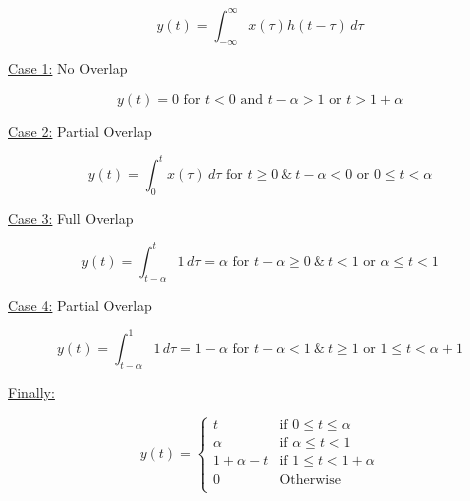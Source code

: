 \documentclass[20pt]{article}
\begin{document}
\begin{equation}
    y(t)= \int_{-\infty}^{\infty} x(\tau) h(t-\tau)  \,d\tau
\end{equation}

\underline{Case 1:} No Overlap

\begin{equation}
    y(t)=0 \text{ for } t < 0 \text{ and } t - \alpha >  1 \text{ or } t  > 1 + \alpha
\end{equation}


\underline{Case 2:} Partial Overlap

\begin{equation}
    y(t)= \int_{0}^{t} x(\tau) \,d\tau  \text{ for } t \geq 0\ \& \ t - \alpha < 0 \text{ or } 0 \leq t < \alpha
\end{equation}

\underline{Case 3:} Full Overlap

\begin{equation}
    y(t)= \int_{t-\alpha}^{t} 1 \,d\tau = \alpha  \text{ for } t - \alpha \geq 0\ \& \ t < 1 \text{ or } \alpha \leq t < 1
\end{equation}

\underline{Case 4:} Partial Overlap

\begin{equation}
    y(t)= \int_{t-\alpha}^{1} 1 \,d\tau = 1 - \alpha  \text{ for } t - \alpha < 1\ \& \ t \geq 1 \text{ or } 1 \leq t <  \alpha + 1
\end{equation}

\underline{Finally:}

\begin{equation}
    y(t)=
    \begin{cases}
        t          & \text{if } 0 \leq t \leq \alpha  \\
        \alpha     & \text{if } \alpha \leq t < 1     \\
        1+\alpha-t & \text{if } 1 \leq t < 1 + \alpha \\
        0          & \text{Otherwise}                 \\
    \end{cases}
\end{equation}


\begin{center}

\end{center}
\end{document}
